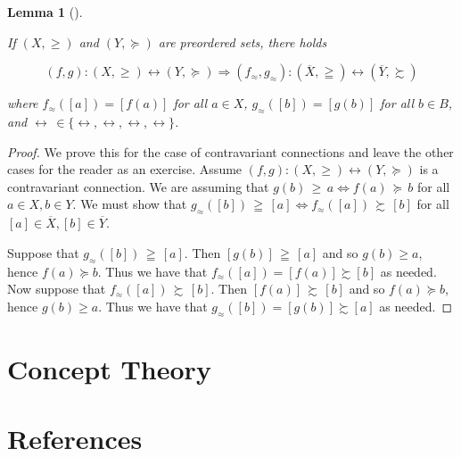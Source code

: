 \documentclass[
  letterpaper,
  10pt,
  reqno,
  twopage,
  openany]{book}
\theoremstyle{plain}
\newtheorem{lemma}{Lemma}[chapter]
\theoremstyle{definition}
\theoremstyle{definition}
\theoremstyle{definition}
\theoremstyle{plain}
\theoremstyle{plain}
\theoremstyle{remark}
\begin{document}
\leavevmode{}%
\begin{lemma}[]\label{lem-preconnequiv}

If \((X,\geq)\) and \((Y,\succeq)\) are preordered sets, there holds

\begin{equation}
\label{connandpre}
{(f,g):(X,\geq) \leftrightarrow (Y,\succeq)} \Rightarrow 
{(f_\approx,g_\approx):(\overline{X},\geqq) \leftrightarrow (\overline{Y},\succsim)}
\end{equation}

where \(f_\approx([a])=[f(a)]\) for all \(a\in X\),
\(g_\approx([b])=[g(b)]\) for all \(b\in B\), and
\({\leftrightarrow\,\in\{\leftrightarrow, \leftrightarrow,\leftrightarrow,\leftrightarrow\}}\).

\end{lemma}

\begin{proof}

We prove this for the case of contravariant connections and leave the
other cases for the reader as an exercise. Assume
\({(f,g):(X,\geq) \leftrightarrow (Y,\succeq)}\) is a contravariant
connection. We are assuming that
\(g(b)\,\geq\,a \Leftrightarrow f(a)\,\succeq\,b\) for all
\({a\in X, b\in Y}\). We must show that
\({g_\approx([b])\,\geqq\,[a] \Leftrightarrow f_\approx([a])\,\succsim\,[b]}\)
for all \({[a]\in \overline{X}, [b]\in \overline{Y}}\).

Suppose that \({g_\approx([b])\,\geqq\,[a]}\). Then
\([g(b)]\,\geqq\,[a]\) and so \({g(b)\geq a}\), hence
\({f(a)\succeq b}\). Thus we have that
\({f_\approx([a])=[f(a)]\succsim [b]}\) as needed. Now suppose that
\({f_\approx([a])\,\succsim\,[b]}\). Then \({[f(a)]\,\succsim\,[b]}\)
and so \({f(a)\succeq b}\), hence \(g(b)\geq a\). Thus we have that
\({g_\approx([b])=[g(b)]\succsim [a]}\) as needed.

\end{proof}


\hypertarget{concept-theory}{%
\chapter{Concept Theory}\label{concept-theory}}


\hypertarget{references}{%
\chapter*{References}\label{references}}
\end{document}
